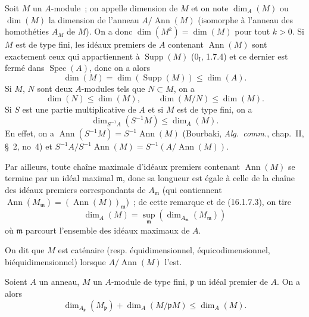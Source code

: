 \begin{env}[16.1.7]
\label{0.16.1.7-fr}
Soit $M$ un $A$-module~; on appelle dimension de $M$ et on note
$\dim_A(M)$ ou $\dim(M)$ la dimension de l'anneau $A/\operatorname{Ann}(M)$
(isomorphe à l'anneau des homothéties $A_M$ de $M$). On a donc
$\dim(M^k)=\dim(M)$ pour tout $k>0$. Si $M$ est de type fini, les idéaux
premiers de $A$ contenant $\operatorname{Ann}(M)$ sont exactement ceux qui
appartiennent à $\operatorname{Supp}(M)$ ($0_{\mathrm I}$, 1.7.4) et ce
dernier est fermé dans $\operatorname{Spec}(A)$, donc on a alors
\[
\label{0.16.1.7.1-fr}
  \dim(M)=\dim(\operatorname{Supp}(M))\leq\dim(A).
\tag{16.1.7.1}
\]
Si $M$, $N$ sont deux $A$-modules tels que $N\subset M$, on a
\[
\label{0.16.1.7.2-fr}
  \dim(N)\leq\dim(M),\qquad \dim(M/N)\leq\dim(M).
\tag{16.1.7.2}
\]
Si $S$ est une partie multiplicative de $A$ et si $M$ est de type fini, on a
\[
\label{0.16.1.7.3-fr}
  \dim_{S^{-1}A}(S^{-1}M)\leq\dim_A(M).
\tag{16.1.7.3}
\]
En effet, on a
$\operatorname{Ann}(S^{-1}M)=S^{-1}\operatorname{Ann}(M)$ (Bourbaki,
\emph{Alg.~comm.}, chap.~II, \S~2, no~4) et
$S^{-1}A/S^{-1}\operatorname{Ann}(M)=S^{-1}(A/\operatorname{Ann}(M))$.

Par ailleurs, toute chaîne maximale d'idéaux premiers contenant
$\operatorname{Ann}(M)$ se termine par un idéal maximal $\mathfrak{m}$, donc
sa longueur est égale à celle de la chaîne des idéaux premiers correspondants
de $A_{\mathfrak{m}}$ (qui contiennent
$\operatorname{Ann}(M_{\mathfrak{m}})=(\operatorname{Ann}(M))_{\mathfrak{m}}$)~;
de cette remarque et de (16.1.7.3), on tire
\[
\label{0.16.1.7.4-fr}
  \dim_A(M)=\sup_{\mathfrak{m}}
  (\dim_{A_{\mathfrak{m}}}(M_{\mathfrak{m}}))
\tag{16.1.7.4}
\]
où $\mathfrak{m}$ parcourt l'ensemble des idéaux maximaux de $A$.

On dit que $M$ est caténaire (resp. équidimensionnel, équicodimensionnel,
biéquidimensionnel) lorsque $A/\operatorname{Ann}(M)$ l'est.
\end{env}

\begin{proposition}[16.1.8]
\label{0.16.1.8-fr}
Soient $A$ un anneau, $M$ un $A$-module de type fini, $\mathfrak{p}$ un idéal
premier de $A$. On a alors
\[
\label{0.16.1.8.1-fr}
  \dim_{A_{\mathfrak{p}}}(M_{\mathfrak{p}})
  +\dim_A(M/\mathfrak{p}M)\leq\dim_A(M).
\tag{16.1.8.1}
\]
\end{proposition}

